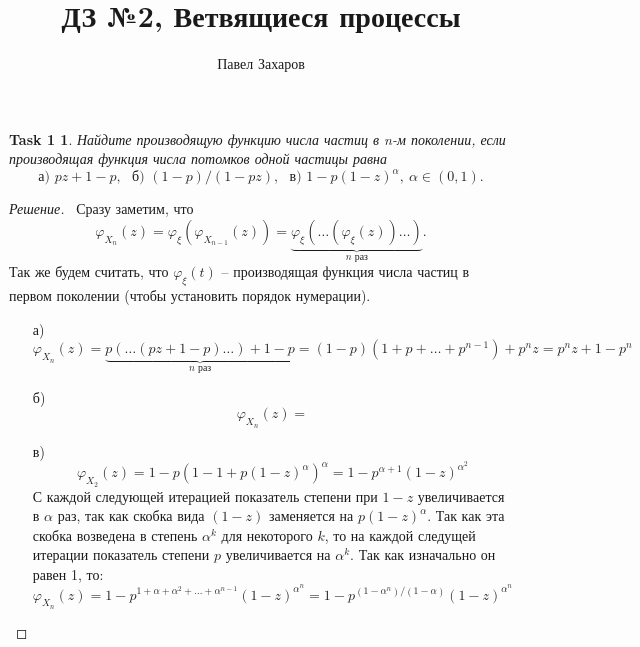 \documentclass[12pt,a4paper]{extarticle}
\title{\Huge{ДЗ №2, Ветвящиеся процессы}}
\author{Павел Захаров}
\date{}
\newtheorem*{task1}{Task 1}
\newcommand{\fe}{\varphi}
\begin{document}
	\maketitle

	
	\vspace{\baselineskip}

	
	
	\vspace{\baselineskip}
	\begin{task1}
		Найдите производящую функцию числа частиц в n-м поколении, если производящая функция числа потомков одной частицы равна
		\[
			\text{а) } pz + 1 - p,~~~ \text{б) } (1 - p)/(1 - pz),~~~ \text{в) } 1 - p(1 - z)^{\alpha} ,~ \alpha \in (0, 1).	
		\]
	\end{task1}
	
	\begin{proof}[Решение]
		\
		Сразу заметим, что 
		\[
			\fe_{X_n}(z) = \fe_{\xi}(	\fe_{X_{n-1}}(z)) = \underbrace{\fe_{\xi} (\ldots (\fe_{\xi}(z)) \ldots)}_{\textit{n раз}}.
		\]
		Так же будем считать, что $\fe_{\xi}(t)$ -- производящая функция числа частиц в первом поколении (чтобы установить порядок нумерации).
		\begin{itemize}
			\item[а)]
			\[
				\fe_{X_n}(z) = \underbrace{p(\ldots (pz + 1-p) \ldots) + 1 - p}_{\textit{n раз}} = (1-p)(1 + p + \ldots + p^{n-1}) + p^nz = p^n z + 1 - p^n
			\]
			\item[б)] 
			\[
				\fe_{X_n}(z) = 	
			\]
			\item[в)] 
			\[
				\fe_{X_2}(z) = 1 - p(1-1+p(1-z)^{\alpha})^{\alpha} = 1-p^{\alpha + 1} (1-z)^{\alpha^2}
			\]
			С каждой следующей итерацией показатель степени при $1-z$ увеличивается в $\alpha$ раз, так как скобка вида $(1-z)$ заменяется на $p(1-z)^{\alpha}$. Так как эта скобка возведена в степень $\alpha^k$ для некоторого $k$, то на каждой следущей итерации показатель степени $p$ увеличивается на $\alpha^k$. Так как изначально он равен 1, то:
			\[
				\fe_{X_n}(z) = 1-p^{1 + \alpha + \alpha^2 + \ldots + \alpha^{n-1}}(1-z)^{\alpha^n} = 1-p^{(1 - \alpha^n) / (1-\alpha)}(1-z)^{\alpha^n} 
			\]
		\end{itemize}
	\end{proof}
	
	
	\vspace{\baselineskip}
	
	
	
	
		
\end{document}
